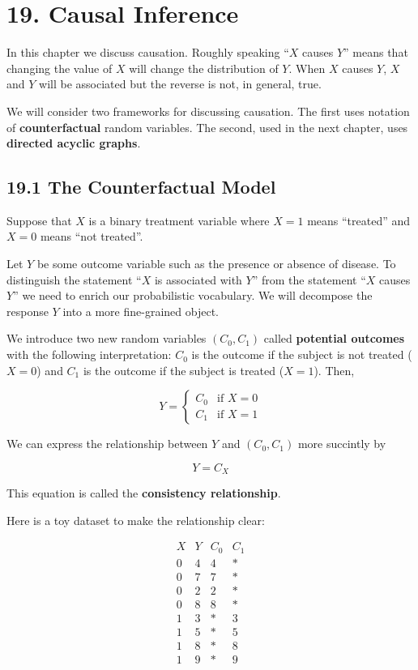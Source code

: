 \section*{19. Causal Inference}\label{causal-inference}

In this chapter we discuss causation. Roughly speaking ``\(X\) causes
\(Y\)'' means that changing the value of \(X\) will change the
distribution of \(Y\). When \(X\) causes \(Y\), \(X\) and \(Y\) will be
associated but the reverse is not, in general, true.

We will consider two frameworks for discussing causation. The first uses
notation of \textbf{counterfactual} random variables. The second, used
in the next chapter, uses \textbf{directed acyclic graphs}.

\subsection*{19.1 The Counterfactual Model}\label{the-counterfactual-model}

Suppose that \(X\) is a binary treatment variable where \(X = 1\) means
``treated'' and \(X = 0\) means ``not treated''.

Let \(Y\) be some outcome variable such as the presence or absence of
disease. To distinguish the statement ``\(X\) is associated with \(Y\)''
from the statement ``\(X\) causes \(Y\)'' we need to enrich our
probabilistic vocabulary. We will decompose the response \(Y\) into a
more fine-grained object.

We introduce two new random variables \((C_{0}, C_{1})\) called
\textbf{potential outcomes} with the following interpretation: \(C_{0}\)
is the outcome if the subject is not treated (\(X = 0\)) and \(C_{1}\) is
the outcome if the subject is treated (\(X = 1\)). Then,

\[ Y = \begin{cases}
C_{0} & \text{if } X = 0 \\
C_{1} & \text{if } X = 1
\end{cases}\]

We can express the relationship between \(Y\) and \((C_{0}, C_{1})\) more
succintly by

\[ Y = C_X \]

This equation is called the \textbf{consistency relationship}.

Here is a toy dataset to make the relationship clear:

\[
\begin{array}{cccc}
X & Y & C_{0} & C_{1} \\
\hline
0 & 4 & 4 & * \\
0 & 7 & 7 & * \\
0 & 2 & 2 & * \\
0 & 8 & 8 & * \\
\hline
1 & 3 & * & 3 \\
1 & 5 & * & 5 \\
1 & 8 & * & 8 \\
1 & 9 & * & 9
\end{array}
\]

